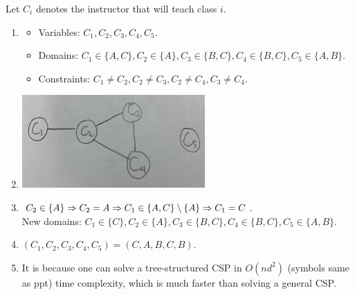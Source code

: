 \begin{pr}
Let $C_i$ denotes the instructor that will teach class $i$.
\begin{enumerate}[(1)]
\item
\begin{itemize}
\item Variables: $C_1, C_2, C_3, C_4, C_5$.
\item Domains: $C_1\in\{A, C\}, C_2\in\{A\}, C_3\in\{B, C\}, C_4\in\{B, C\}, C_5\in\{A, B\}$.
\item Constraints: $C_1\neq C_2, C_2\neq C_3, C_2\neq C_4, C_3\neq C_4$.
\end{itemize}
\item \includegraphics[width=7cm]{p3.JPG}
\item $C_2\in\{A\}\Rightarrow C_2=A\Rightarrow C_1\in\{A, C\}\setminus\{A\}\Rightarrow C_1=C$.\\
New domains: $C_1\in\{C\}, C_2\in\{A\}, C_3\in\{B, C\}, C_4\in\{B, C\}, C_5\in\{A, B\}$.
\item $(C_1, C_2, C_3, C_4, C_5)=(C, A, B, C, B)$.
\item It is because one can solve a tree-structured CSP in $O(nd^2)$ (symbols same as ppt) time complexity, which is much faster than solving a general CSP.
\end{enumerate}
\end{pr}
\newpage
